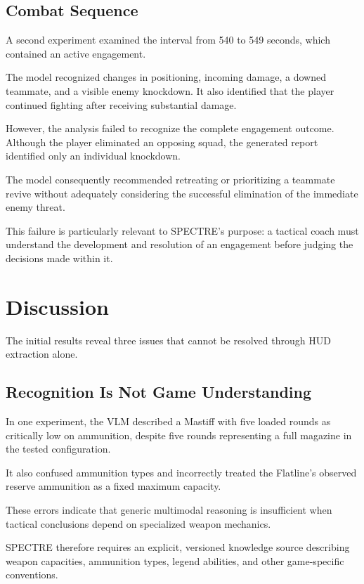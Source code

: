 \documentclass[10pt,letterpaper]{article}
\begin{document}
\subsection{Combat Sequence}

A second experiment examined the interval from
540 to 549 seconds, which contained an active engagement.

The model recognized changes in positioning, incoming
damage, a downed teammate, and a visible enemy knockdown.
It also identified that the player continued fighting
after receiving substantial damage.

However, the analysis failed to recognize the complete
engagement outcome. Although the player eliminated an
opposing squad, the generated report identified only
an individual knockdown.

The model consequently recommended retreating or
prioritizing a teammate revive without adequately
considering the successful elimination of the immediate
enemy threat.

This failure is particularly relevant to SPECTRE's
purpose: a tactical coach must understand the
development and resolution of an engagement before
judging the decisions made within it.

\section{Discussion}

The initial results reveal three issues that cannot
be resolved through HUD extraction alone.

\subsection{Recognition Is Not Game Understanding}

In one experiment, the VLM described a Mastiff
with five loaded rounds as critically low on ammunition,
despite five rounds representing a full magazine
in the tested configuration.

It also confused ammunition types and incorrectly
treated the Flatline's observed reserve ammunition
as a fixed maximum capacity.

These errors indicate that generic multimodal reasoning
is insufficient when tactical conclusions depend on
specialized weapon mechanics.

SPECTRE therefore requires an explicit, versioned
knowledge source describing weapon capacities,
ammunition types, legend abilities, and other
game-specific conventions.
\end{document}

